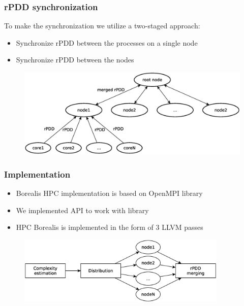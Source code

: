 \begin{frame}
\frametitle{rPDD synchronization}
To make the synchronization we utilize a two-staged approach:
	\begin{itemize}
		\item Synchronize rPDD between the processes on a single node
		\item Synchronize rPDD between the nodes
\end{itemize}
	\begin{figure}
		\includegraphics[width=115mm]{image/pddMerge}
	\end{figure}	
\end{frame}


\begin{frame}
\frametitle{Implementation}
\begin{itemize}
	\item Borealis HPC implementation is based on OpenMPI library
	\item We implemented API to work with library
	\item HPC Borealis is implemented in the form of 3 LLVM passes
\end{itemize}
	\begin{figure}
		\includegraphics[width=100mm]{image/passes}
	\end{figure}	
\end{frame}

